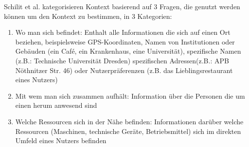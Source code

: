 Schilit et al. \cite{schilit_context-aware_1994} kategorisieren Kontext basierend auf 3 Fragen, die genutzt werden können um den Kontext zu bestimmen, in 3 Kategorien:
\begin{enumerate}
\item{Wo man sich befindet: Enthalt alle Informationen die sich auf einen Ort beziehen, beispielsweise GPS-Koordinaten, Namen von Institutionen oder Gebäuden (ein Café, ein Krankenhaus, eine Universität), spezifische Namen (z.B.: Technische Universität Dresden) spezifischen Adressen(z.B.: APB Nöthnitzer Str. 46) oder Nutzerpräferenzen (z.B. das Lieblingsrestaurant eines Nutzers) }
\item{Mit wem man sich zusammen aufhält: Information über die Personen die um einen herum anwesend sind}
\item{Welche Ressourcen sich in der Nähe befinden: Informationen darüber welche Ressourcen (Maschinen, technische Geräte, Betriebsmittel) sich im direkten Umfeld eines Nutzers befinden}
\end{enumerate}


